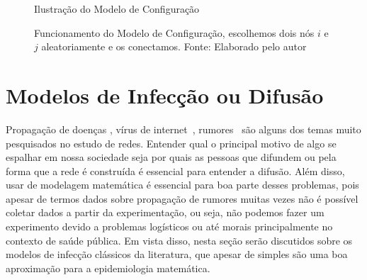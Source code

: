 \begin{figure}[H]
  \centering
  \captionsetup{font=normalsize,skip=0.8pt,singlelinecheck=on,labelsep=endash}
  \caption{Ilustração do Modelo de Configuração}
  \captionsetup{font=small}
  \caption*{Funcionamento do Modelo de Configuração, escolhemos dois nós $i$ e $j$ aleatoriamente e os conectamos. Fonte: Elaborado pelo autor}
  \label{img:MC}
\end{figure}

\section{Modelos de Infecção ou Difusão}

Propagação de doenças \cite{deArruda2018,Wang2019,Bogu2002,7393962}, vírus de internet~\cite{Zhang2016,Gan2014,Yang2013}, rumores~\cite{rumor,Moreno2004,Yang2010} são alguns dos temas muito pesquisados no estudo de redes. Entender qual o principal motivo de algo se espalhar em nossa sociedade seja por quais as pessoas que difundem ou pela forma que a rede é construída é essencial para entender a difusão. Além disso, usar de modelagem matemática é essencial para boa parte desses problemas, pois apesar de termos dados sobre propagação de rumores muitas vezes não é possível coletar dados a partir da experimentação, ou seja, não podemos fazer um experimento devido a problemas logísticos ou até morais principalmente no contexto de saúde pública. Em vista disso, nesta seção serão discutidos sobre os modelos de infecção clássicos da literatura, que apesar de simples são uma boa aproximação para a epidemiologia matemática.


